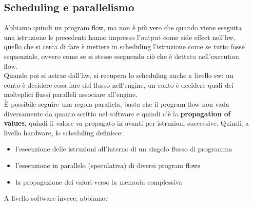 \documentclass[12pt, oneside]{extbook}
\begin{document}
\subsection{Scheduling e parallelismo}
Abbiamo quindi un program flow, ma non è più vero che quando viene eseguita una istruzione le precedenti hanno impresso l'output come side effect nell'hw, quello che si cerca di fare è mettere in scheduling l'istruzione come se tutto fosse sequenziale, ovvero come se si stesse eseguendo ciò che è dettato nell'execution flow.\\ Quando poi si astrae dall'hw, si recupera lo scheduling anche a livello sw: un conto è decidere cosa fare del flusso nell'engine, un conto è decidere quali dei molteplici flussi paralleli associare all'engine.\\ È possibile seguire una regola parallela, basta che il program flow non vada diversamente da quanto scritto nel software e quindi c'è la \textbf{propagation of values}, quindi il valore va propagato in avanti per istruzioni successive. 
Quindi, a livello hardware, lo scheduling definisce:
\begin{itemize}
\item l'esecuzione delle istruzioni all'interno di un singolo flusso di programma
\item l'esecuzione in parallelo (speculativa) di diversi program flows
\item la propagazione dei valori verso la memoria complessiva
\end{itemize}
A livello software invece, abbiamo:
\end{document}
